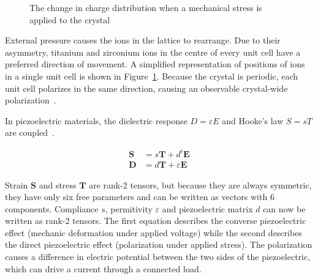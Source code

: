 \documentclass[a4paper,10pt]{article}
\renewcommand{\vec}{\mathbf}
\begin{document}
\begin{figure}[!h]
  \centering

\hspace{1cm}
\caption{The change in charge distribution when a mechanical stress is applied to the crystal~\cite{cottone}}
\label{fig:piezo-theory}
\end{figure}

External pressure causes the ions in the lattice to rearrange. Due to their asymmetry, titanium and zirconium ions in the centre of every unit cell have a preferred direction of movement. A simplified representation of positions of ions in a single unit cell is shown in Figure~\ref{fig:piezo-theory}. Because the crystal is periodic, each unit cell polarizes in the same direction, causing an observable crystal-wide polarization~\cite{cottone}. 

In piezoelectric materials, the dielectric response $D = \varepsilon E$ and Hooke's law $S = sT$ are coupled~\cite{wiki:piezo}. 

\begin{align}
 \vec S &= s \vec T + d^t \vec E \\
 \vec D &= d \vec T + \varepsilon \vec E
\end{align}

Strain $\vec S$ and stress $\vec T$ are rank-2 tensors, but because they are always symmetric, they have only six free parameters and can be written as vectors with 6 components. Compliance $s$, permitivity $\varepsilon$ and piezoelectric matrix $d$ can now be written as rank-2 tensors. The first equation describes the converse piezoelectric effect (mechanic deformation under applied voltage) while the second describes the direct piezoelectric effect (polarization under applied stress). The polarization causes a difference in electric potential between the two sides of the piezoelectric, which can drive a current through a connected load. 
\end{document}
